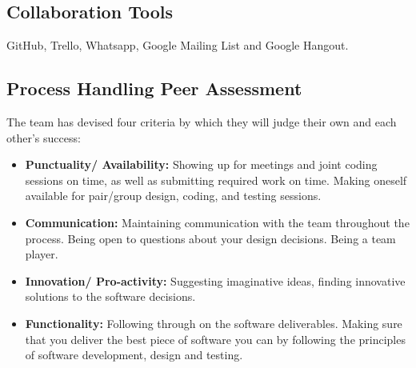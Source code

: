\documentclass[11pt]{article}
\begin{document}
\subsection{Collaboration Tools}

GitHub, Trello, Whatsapp, Google Mailing List and Google Hangout.

\subsection{Process Handling Peer Assessment}
The team has devised four criteria by which they will judge their own
and each other's success:
\begin{itemize}
	\item \textbf{Punctuality/ Availability:}
	Showing up for meetings and joint coding sessions on time, as well as submitting required work on time.
	Making oneself available for pair/group design, coding, and testing sessions.
	
	\item \textbf{Communication:}
	 Maintaining communication with the team throughout the process. Being open to questions about your design decisions. Being a team player.
	
	\item \textbf{Innovation/ Pro-activity:}
	 Suggesting imaginative ideas, finding innovative solutions to the software decisions.
	
	\item \textbf{Functionality:}
	 Following through on the software deliverables. Making sure that you deliver the best piece of software you can by following the principles of software development, design and testing.
\end{itemize}
\end{document}
